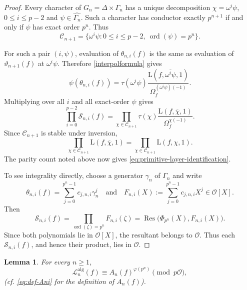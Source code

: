 \documentclass[11pt,table]{amsart}
\newtheorem{lemma}[theorem]{Lemma}
\numberwithin{equation}{section}
\begin{document}
\begin{proof}
Every character of \(G_n=\Delta\times\Gamma_n\) has a unique
decomposition $\chi=\omega^i\psi$, $0\leq i\leq p-2$ and $\psi\in\widehat{\Gamma_n}$. Such a character has conductor exactly \(p^{n+1}\) if and only if
\(\psi\) has exact order \(p^n\).  Thus
\[
        \mathcal C_{n+1}
        =
        \{
        \omega^i\psi:
        0\leq i\leq p-2,\
        \operatorname{ord}(\psi)=p^n
        \}.
\]

For such a pair \((i,\psi)\), evaluation of
\(\theta_{n,i}(f)\) is the same as evaluation of
\(\vartheta_{n+1}(f)\) at \(\omega^i\psi\).  Therefore
\eqref{interpolformula} gives
\[
        \psi(\theta_{n,i}(f))
        =
        \tau(\omega^i\psi)
        \frac{\mathrm{L}(f,\overline{\omega^i\psi},1)}
             {\Omega_f^{(\omega^i\psi)(-1)}}.
\]
Multiplying over all \(i\) and all exact-order \(\psi\) gives
\[
        \prod_{i=0}^{p-2}\mathcal S_{n,i}(f)
        =
        \prod_{\chi\in\mathcal C_{n+1}}
        \tau(\chi)
        \frac{\mathrm{L}(f,\overline\chi,1)}
             {\Omega_f^{\chi(-1)}}.
\]
Since \(\mathcal C_{n+1}\) is stable under inversion,
\[
        \prod_{\chi\in\mathcal C_{n+1}}
        \mathrm{L}(f,\overline\chi,1)
        =
        \prod_{\chi\in\mathcal C_{n+1}}
        \mathrm{L}(f,\chi,1).
\]
The parity count noted above now gives
\eqref{eq:primitive-layer-identification}.

To see integrality directly, choose a generator \(\gamma_n\) of
\(\Gamma_n\) and write
\[
        \theta_{n,i}(f)
        =
        \sum_{j=0}^{p^n-1}c_{j,n,i}\gamma_n^j
        \quad\text{and}\quad
        F_{n,i}(X)
        :=
        \sum_{j=0}^{p^n-1}c_{j,n,i}X^j
        \in\mathcal O[X].
\]
Then
\[
        \mathcal S_{n,i}(f)
        =
        \prod_{\operatorname{ord}(\zeta)=p^n}
        F_{n,i}(\zeta)
        =
        \operatorname{Res}
        \bigl(
        \Phi_{p^n}(X),F_{n,i}(X)
        \bigr).
\]
Since both polynomials lie in \(\mathcal O[X]\), the resultant belongs
to \(\mathcal O\).  Thus each \(\mathcal S_{n,i}(f)\), and hence their
product, lies in \(\mathcal O\).
\end{proof}

\begin{lemma}
\label{lem:primitive-layer-reduction}
For every \(n\geq1\),
\begin{equation}
\label{eq:primitive-layer-algebraic-congruence}
        \mathscr L_n^{\operatorname{alg}}(f)
        \equiv
        A_n(f)^{\varphi(p^n)}
        \pmod{p\mathcal O},
\end{equation}
(cf. \eqref{eq:def-Ani} for the definition of $A_n(f)$).
\end{lemma}
\end{document}
